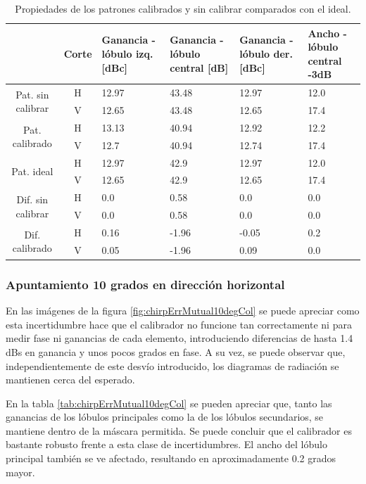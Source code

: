 \begin{table}[H]
  \footnotesize
  \centering
  \begin{tabular}{|c|c|p{2cm}|p{2.5cm}|p{2.5cm}|p{2.5cm}|}
    \cline{2-6}
    \multicolumn{1}{c|}{} & Corte & Ganancia - lóbulo izq. [dBc] & Ganancia - lóbulo central [dB] &
    Ganancia - lóbulo der. [dBc] & Ancho - lóbulo central -3dB \tabularnewline\hline
    \multirow{2}{2cm}{Pat. sin calibrar} & H & 12.97 & 43.48 & 12.97 & 12.0 \tabularnewline\cline{2-6}
     & V & 12.65 & 43.48 & 12.65 & 17.4 \tabularnewline\hline
    \multirow{2}{2cm}{Pat. calibrado} & H & 13.13 & 40.94 & 12.92 & 12.2 \tabularnewline\cline{2-6}
     & V & 12.7 & 40.94 & 12.74 & 17.4 \tabularnewline\hline
    \multirow{2}{2cm}{Pat. ideal} & H & 12.97 & 42.9 & 12.97 & 12.0 \tabularnewline\cline{2-6}
     & V & 12.65 & 42.9 & 12.65 & 17.4 \tabularnewline\hline
    \multirow{2}{2cm}{Dif. sin calibrar} & H & 0.0 & 0.58 & 0.0 & 0.0\tabularnewline\cline{2-6}
     & V & 0.0 & 0.58 & 0.0 & 0.0 \tabularnewline\hline
    \multirow{2}{2cm}{Dif. calibrado} & H & 0.16 & -1.96 & -0.05 & 0.2 \tabularnewline\cline{2-6}
     & V & 0.05 & -1.96 & 0.09 & 0.0 \tabularnewline\hline
  \end{tabular}
  \caption{Propiedades de los patrones calibrados y sin calibrar comparados con el ideal.}
  \label{tab:chirpErrMutual0deg}
\end{table}


\subsubsection{Apuntamiento 10 grados en dirección horizontal}

En las imágenes de la figura \ref{fig:chirpErrMutual10degCol} se puede apreciar como esta incertidumbre hace que el calibrador 
no funcione tan correctamente ni para medir fase ni ganancias de cada elemento, introduciendo diferencias de hasta 1.4 dBs en 
ganancia y unos pocos grados en fase. A su vez, se puede observar que, independientemente de este desvío introducido, los diagramas de 
radiación se mantienen cerca del esperado.

En la tabla \ref{tab:chirpErrMutual10degCol} se pueden apreciar que, tanto las ganancias de los lóbulos principales como la de 
los lóbulos secundarios, se mantiene dentro de la máscara permitida. Se puede concluir que el calibrador es bastante robusto 
frente a esta clase de incertidumbres. El ancho del lóbulo principal también se ve afectado, resultando en aproximadamente 0.2
grados mayor.

